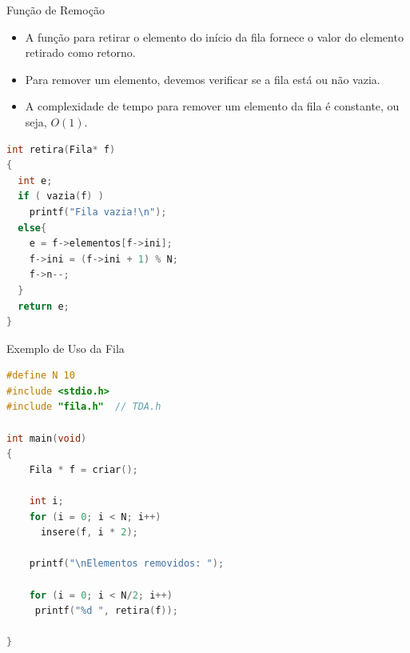 \begin{frame}[fragile]{Função de Remoção} 
	\begin{itemize}
		\item A função para retirar o elemento do 
		início da fila fornece o valor do elemento retirado 
		como retorno.
		\item Para remover um elemento, devemos verificar se 
		a fila está ou não vazia.
		\item A complexidade de tempo para remover 
		um elemento da fila é constante, ou seja, $O(1)$.
	\end{itemize}
	
\footnotesize
\begin{lstlisting}[language=C]
int retira(Fila* f)
{
  int e;
  if ( vazia(f) )
    printf("Fila vazia!\n");
  else{
    e = f->elementos[f->ini];
    f->ini = (f->ini + 1) % N;
    f->n--;
  }
  return e;
}
\end{lstlisting}	
\end{frame} 

%

\begin{frame}[fragile]{Exemplo de Uso da Fila}

\begin{footnotesize}

\begin{lstlisting}[language=C]
#define N 10
#include <stdio.h>
#include "fila.h"  // TDA.h

int main(void)
{
    Fila * f = criar();
    
    int i;
    for (i = 0; i < N; i++)
      insere(f, i * 2);
      
    printf("\nElementos removidos: ");
      
    for (i = 0; i < N/2; i++)
     printf("%d ", retira(f)); 
               
}
\end{lstlisting}
\end{footnotesize}
\end{frame} 


